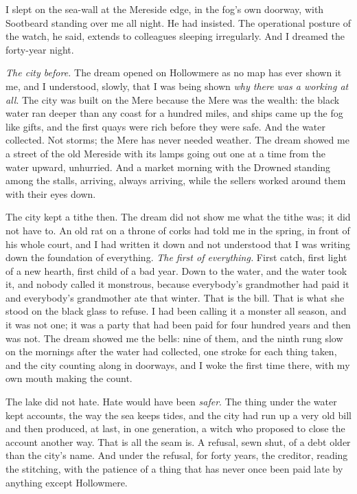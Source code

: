 I slept on the sea-wall at the Mereside edge, in the fog's own doorway, with Sootbeard standing over me all night. He had insisted. The operational posture of the watch, he said, extends to colleagues sleeping irregularly. And I dreamed the forty-year night.

\emph{The city before.} The dream opened on Hollowmere as no map has ever shown it me, and I understood, slowly, that I was being shown \emph{why there was a working at all}. The city was built on the Mere because the Mere was the wealth: the black water ran deeper than any coast for a hundred miles, and ships came up the fog like gifts, and the first quays were rich before they were safe. And the water collected. Not storms; the Mere has never needed weather. The dream showed me a street of the old Mereside with its lamps going out one at a time from the water upward, unhurried. And a market morning with the Drowned standing among the stalls, arriving, always arriving, while the sellers worked around them with their eyes down.

The city kept a tithe then. The dream did not show me what the tithe was; it did not have to. An old rat on a throne of corks had told me in the spring, in front of his whole court, and I had written it down and not understood that I was writing down the foundation of everything. \emph{The first of everything.} First catch, first light of a new hearth, first child of a bad year. Down to the water, and the water took it, and nobody called it monstrous, because everybody's grandmother had paid it and everybody's grandmother ate that winter. That is the bill. That is what she stood on the black glass to refuse. I had been calling it a monster all season, and it was not one; it was a party that had been paid for four hundred years and then was not. The dream showed me the bells: nine of them, and the ninth rung slow on the mornings after the water had collected, one stroke for each thing taken, and the city counting along in doorways, and I woke the first time there, with my own mouth making the count.

The lake did not hate. Hate would have been \emph{safer}. The thing under the water kept accounts, the way the sea keeps tides, and the city had run up a very old bill and then produced, at last, in one generation, a witch who proposed to close the account another way. That is all the seam is. A refusal, sewn shut, of a debt older than the city's name. And under the refusal, for forty years, the creditor, reading the stitching, with the patience of a thing that has never once been paid late by anything except Hollowmere.

